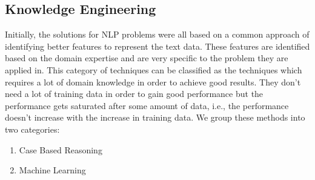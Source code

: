 \subsection{Knowledge Engineering}\label{sec:ke}
Initially, the solutions for NLP problems were all based on a common approach of identifying better features to represent the text data. These features are identified based on the domain expertise and are very specific to the problem they are applied in. This category of techniques can be classified as the techniques which requires a lot of domain knowledge in order to achieve good results. They don't need a lot of training data in order to gain good performance but the performance gets saturated after some amount of data, i.e., the performance doesn't increase with the increase in training data. We group these methods into two categories:

\begin{enumerate}
    \item Case Based Reasoning
    \item Machine Learning
\end{enumerate}







